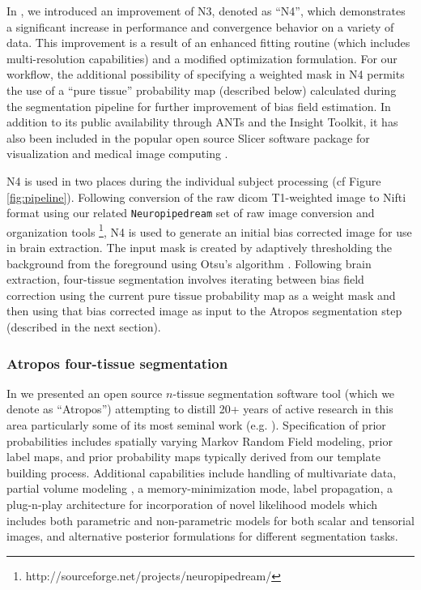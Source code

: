 In \cite{tustison2010}, we introduced an improvement of N3, denoted as
``N4'', which demonstrates a significant increase in performance and convergence behavior
on a variety of data.  This improvement is a result of an enhanced 
fitting routine (which includes multi-resolution capabilities) and a modified optimization 
formulation.  For our workflow, the additional possibility of specifying
a weighted mask in N4 permits the use of a ``pure tissue'' probability map 
(described below)
calculated during the segmentation pipeline for further improvement of 
bias field estimation.  In addition to its public availability 
through ANTs and the Insight Toolkit, it has also been included in
the popular open source Slicer software package for visualization and medical
image computing \citep{fedorov2011}.

N4 is used in two places during the individual subject processing (cf Figure
\ref{fig:pipeline}).  Following conversion of the raw dicom T1-weighted image
to Nifti format using our related \verb#Neuropipedream# set of raw image conversion
and organization tools%
\footnote{
http://sourceforge.net/projects/neuropipedream/
}, N4 is used to generate an initial bias corrected image for use in
brain extraction.  The input mask is created by adaptively thresholding 
the background from the foreground using Otsu's algorithm \citep{otsu1979}.
Following brain extraction, four-tissue segmentation involves iterating
between bias field correction using the current pure tissue 
probability map as a weight mask and then using that bias corrected image
as input to the Atropos segmentation step (described in the next section). 

\subsubsection{Atropos four-tissue segmentation}

In \cite{avants2011a} we presented an open source $n$-tissue segmentation software tool
(which we denote as ``Atropos'') attempting to distill 20+ years of active research in this area
particularly some of its most seminal work (e.g. \cite{zhang2001,ashburner2005}). 
Specification of prior probabilities includes spatially varying Markov Random Field modeling, 
prior label maps, and prior probability maps typically derived from our template building 
process.  Additional
capabilities include handling of multivariate data, 
partial volume modeling \citep{shattuck2001}, a memory-minimization mode,
label propagation, a plug-n-play architecture for incorporation of novel likelihood models
which includes both parametric and non-parametric models for both scalar and tensorial
images, and alternative posterior formulations for different segmentation tasks.

